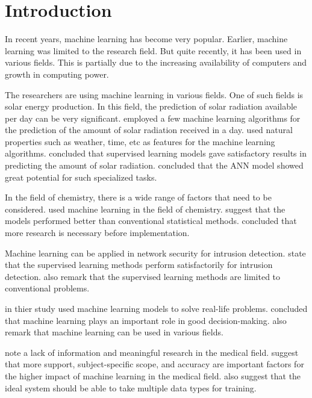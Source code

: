 \section{Introduction}\label{sec:introduciton}

In recent years, machine learning has become very popular. Earlier, machine learning was limited to the research field. But quite recently, it has been used in various fields. This is partially due to the increasing availability of computers and growth in computing power.

The researchers are using machine learning in various fields. One of such fields is solar energy production. In this field, the prediction of solar radiation available per day can be very significant. \cite*{ref_paper_7} employed a few machine learning algorithms for the prediction of the amount of solar radiation received in a day. \citeauthor{ref_paper_7} used natural properties such as weather, time, etc as features for the machine learning algorithms. \citeauthor{ref_paper_7} concluded that supervised learning models gave satisfactory results in predicting the amount of solar radiation. \citeauthor{ref_paper_7} concluded that the ANN model showed great potential for such specialized tasks.

In the field of chemistry, there is a wide range of factors that need to be considered. \cite*{ref_paper_10} used machine learning in the field of chemistry. \citeauthor{ref_paper_10} suggest that the models performed better than conventional statistical methods. \citeauthor{ref_paper_10} concluded that more research is necessary before implementation.

Machine learning can be applied in network security for intrusion detection. \cite*{ref_paper_21} state that the supervised learning methods perform satisfactorily for intrusion detection. \citeauthor{ref_paper_21} also remark that the supervised learning methods are limited to conventional problems.

\cite*{ref_paper_36} in thier study used machine learning models to solve real-life problems. \citeauthor{ref_paper_36} concluded that machine learning plays an important role in good decision-making. \citeauthor{ref_paper_36} also remark that machine learning can be used in various fields.

\cite*{ref_paper_24} note a lack of information and meaningful research in the medical field. \citeauthor{ref_paper_24} suggest that more support, subject-specific scope, and accuracy are important factors for the higher impact of machine learning in the medical field. \citeauthor{ref_paper_24} also suggest that the ideal system should be able to take multiple data types for training.

